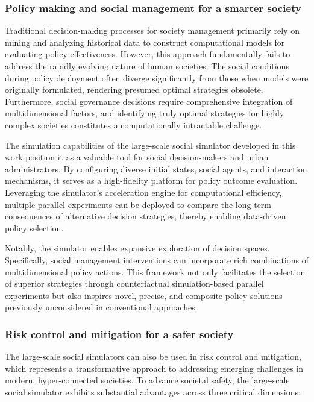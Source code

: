 \subsubsection{Policy making and social management for a smarter society}

Traditional decision-making processes for society management primarily rely on mining and analyzing historical data to construct computational models for evaluating policy effectiveness. However, this approach fundamentally fails to address the rapidly evolving nature of human societies. The social conditions during policy deployment often diverge significantly from those when models were originally formulated, rendering presumed optimal strategies obsolete. Furthermore, social governance decisions require comprehensive integration of multidimensional factors, and identifying truly optimal strategies for highly complex societies constitutes a computationally intractable challenge.  

The simulation capabilities of the large-scale social simulator developed in this work position it as a valuable tool for social decision-makers and urban administrators. By configuring diverse initial states, social agents, and interaction mechanisms, it serves as a high-fidelity platform for policy outcome evaluation. Leveraging the simulator's acceleration engine for computational efficiency, multiple parallel experiments can be deployed to compare the long-term consequences of alternative decision strategies, thereby enabling data-driven policy selection.  

Notably, the simulator enables expansive exploration of decision spaces. Specifically, social management interventions can incorporate rich combinations of multidimensional policy actions. This framework not only facilitates the selection of superior strategies through counterfactual simulation-based parallel experiments but also inspires novel, precise, and composite policy solutions previously unconsidered in conventional approaches.

\subsubsection{Risk control and mitigation for a safer society}
The large-scale social simulators can also be used in risk control and mitigation, which represents a transformative approach to addressing emerging challenges in modern, hyper-connected societies. To advance societal safety, the large-scale social simulator exhibits substantial advantages across three critical dimensions:  

